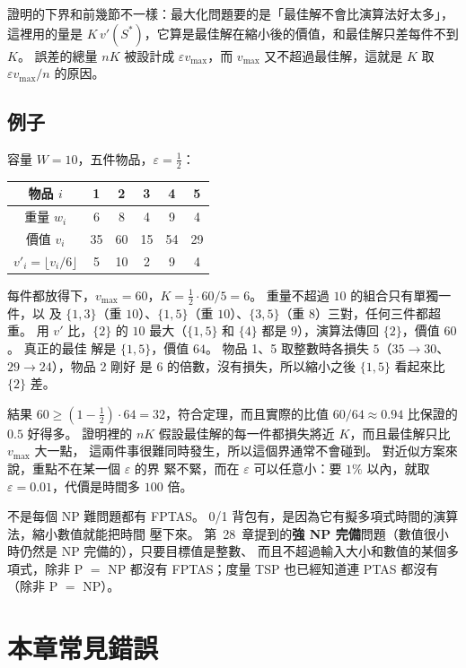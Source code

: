 證明的下界和前幾節不一樣：最大化問題要的是「最佳解不會比演算法好太多」，這裡用的量是
$K\,v'(S^*)$，它算是最佳解在縮小後的價值，和最佳解只差每件不到 $K$。 誤差的總量 $nK$ 被設計成
$\varepsilon v_{\max}$，而 $v_{\max}$ 又不超過最佳解，這就是 $K$ 取 $\varepsilon v_{\max}/n$ 的原因。

\subsection{例子}

容量 $W = 10$，五件物品，$\varepsilon = \frac12$：

\begin{center}
\begin{tabular}{c*{5}{c}}
\toprule
物品 $i$ & 1 & 2 & 3 & 4 & 5 \\
\midrule
重量 $w_i$ & 6 & 8 & 4 & 9 & 4 \\
價值 $v_i$ & 35 & 60 & 15 & 54 & 29 \\
$v'_i = \lfloor v_i / 6 \rfloor$ & 5 & 10 & 2 & 9 & 4 \\
\bottomrule
\end{tabular}
\end{center}

每件都放得下，$v_{\max} = 60$，$K = \frac12 \cdot 60 / 5 = 6$。 重量不超過 $10$ 的組合只有單獨一件，以
及 $\{1, 3\}$（重 $10$）、$\{1, 5\}$（重 $10$）、$\{3, 5\}$（重 $8$）三對，任何三件都超重。 用 $v'$
比，$\{2\}$ 的 $10$ 最大（$\{1, 5\}$ 和 $\{4\}$ 都是 $9$），演算法傳回 $\{2\}$，價值 $60$。 真正的最佳
解是 $\{1, 5\}$，價值 $64$。 物品 1、5 取整數時各損失 $5$（$35 \to 30$、$29 \to 24$），物品 2 剛好
是 $6$ 的倍數，沒有損失，所以縮小之後 $\{1, 5\}$ 看起來比 $\{2\}$ 差。

結果 $60 \ge (1 - \frac12) \cdot 64 = 32$，符合定理，而且實際的比值 $60/64 \approx 0.94$ 比保證的
$0.5$ 好得多。 證明裡的 $nK$ 假設最佳解的每一件都損失將近 $K$，而且最佳解只比 $v_{\max}$ 大一點，
這兩件事很難同時發生，所以這個界通常不會碰到。 對近似方案來說，重點不在某一個 $\varepsilon$ 的界
緊不緊，而在 $\varepsilon$ 可以任意小：要 $1\%$ 以內，就取 $\varepsilon = 0.01$，代價是時間多
$100$ 倍。

不是每個 NP 難問題都有 FPTAS。 0/1 背包有，是因為它有擬多項式時間的演算法，縮小數值就能把時間
壓下來。 第~28~章提到的\textbf{強 NP 完備}問題（數值很小時仍然是 NP 完備的），只要目標值是整數、
而且不超過輸入大小和數值的某個多項式，除非 P $=$ NP 都沒有 FPTAS；度量 TSP 也已經知道連 PTAS 都沒有（除非 P $=$ NP）。

\section{本章常見錯誤}
\label{sec:apx-pitfalls}

